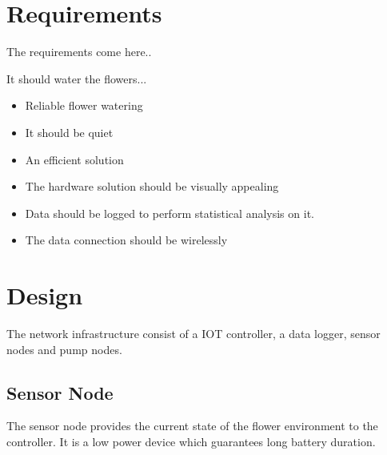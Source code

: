 \documentclass[12pt,a4paper,titlepage,oneside]{article}
\begin{document}
\maketitle



 
 
 
\section{Requirements}

The requirements come here..

It should water the flowers...
\begin{itemize}
\item Reliable flower watering
\item It should be quiet
\item An efficient solution
\item The hardware solution should be visually appealing
\item Data should be logged to perform statistical analysis on it.
\item The data connection should be wirelessly
\end{itemize}


\section{Design}
The network infrastructure consist of a IOT controller, a data logger, sensor nodes and pump nodes.


\subsection{Sensor Node}

The sensor node provides the current state of the flower environment to the controller.
It is a low power device which guarantees long battery duration.
\end{document}
